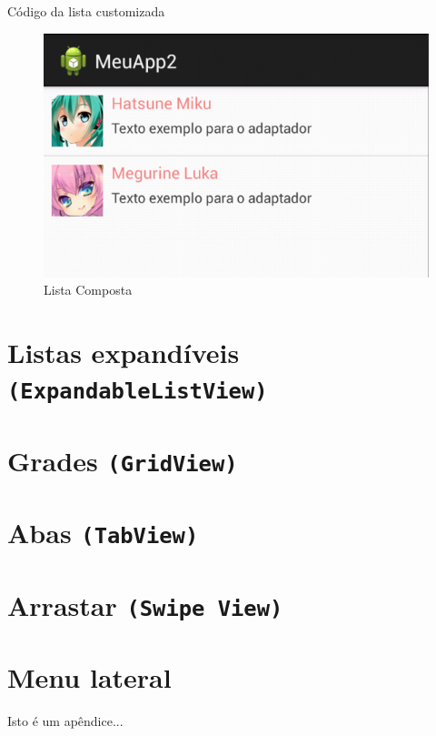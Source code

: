 \documentclass[a4paper,12pt,brazil,doubleside]{book}
\begin{document}
\begin{singlespace}
\begin{listing}[H]
\inputminted[linenos=true,fontsize=\small,frame=lines, framesep=2mm, tabsize=2,numbersep=5pt]{java}{../../src/android/design/customlist.java}
\caption{Código da lista customizada}
\end{listing}	

\begin{figure}[H]
  \centering
  \includegraphics[width=.475\textwidth]{figuras/design/lista-composta.png}
  \caption{Lista Composta}
  \label{fig:e}
\end{figure}

\section{Listas expandíveis \texttt{(ExpandableListView)}}
\section{Grades \texttt{(GridView)}}
\section{Abas \texttt{(TabView)}}
\section{Arrastar \texttt{(Swipe View)}}
\section{Menu lateral}

\end{singlespace}

\begin{singlespace}

%

\end{singlespace}



\singlespace
{}
\cleardoublepage
\thispagestyle{empty}
\doublespace


\appendix
{} %

Isto é um apêndice...

\end{document}
